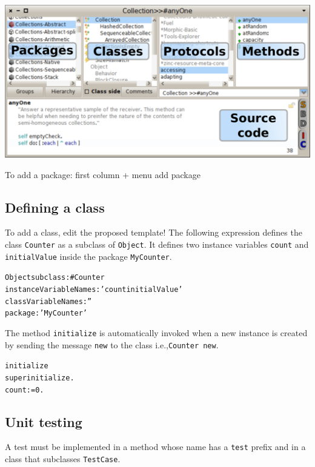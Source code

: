 \documentclass[notumble]{leaflet}
\makeatletter
\newenvironment{displaycode}{%
     \par
     \hspace{1.5em}\begin{minipage}{\linewidth}
       \begin{alltt}\small}{
       \end{alltt}
     \end{minipage}
     \par}
\newcommand{\code}[1]{\foreignlanguage{english}{\texttt{#1}}}
\makeatother
\begin{document}
\begin{center}
  \includegraphics[width=\textwidth]{nautilus-anotated}
\end{center}

To add a package: first column + menu add package

\subsection{Defining a class}
To add a class, edit the proposed template!
The following expression defines the class \code{Counter} as a subclass of \code{Object}.
It defines two instance variables \code{count} and \code{initialValue} inside the package \code{MyCounter}.

\begin{displaycode}
Object subclass: #Counter
   instanceVariableNames: 'count initialValue'
   classVariableNames: '' 
   package: 'MyCounter'
\end{displaycode}

The method \code{initialize} is automatically invoked when a new instance is created by sending the message \code{new} to the class i.e.,\code{Counter new}. 

\begin{displaycode}
initialize 
    super initialize.
    count := 0. 
\end{displaycode}





\subsection{Unit testing}
 A test must be implemented in a method whose name has a \code{test} prefix and in a class that
subclasses \code{TestCase}.
\end{document}
